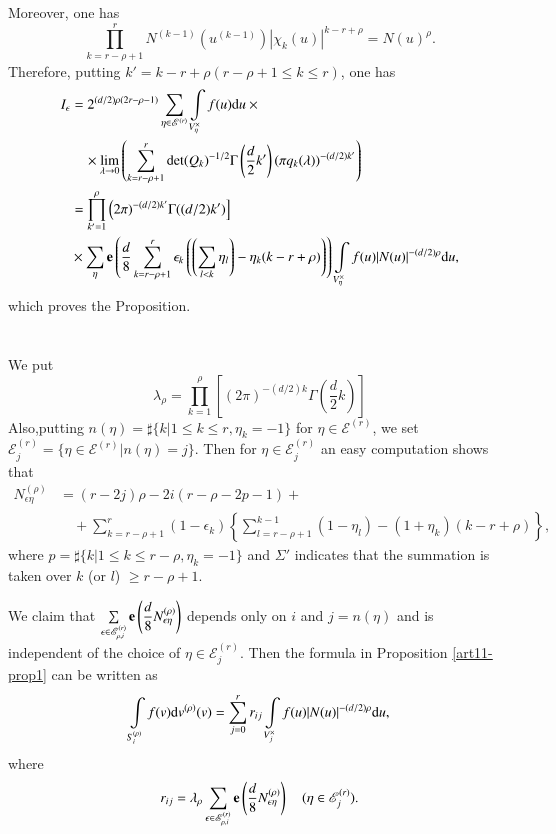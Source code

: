 Moreover, one has
$$
\prod\limits^{r}_{k=r-\rho+1}N^{(k-1)}(u^{(k-1)})|\chi_{k}(u)|^{k-r+\rho}=N(u)^{\rho}.
$$
Therefore, putting $k'=k-r+\rho(r-\rho+1\leq k\leq r)$, one has 
\begin{align*}
I_{\epsilon} &= 2^{(d/2)\rho(2r-\rho-1)}\sum\limits_{\eta\in \mathscr{E}^{(r)}}\int\limits_{V^{\times}_{\eta}}f(u)\mathrm{d} u\times {}\\
&\quad {}\times \lim\limits_{\lambda\to 0}\left(\sum\limits^{r}_{k=r-\rho+1}\det (Q_{k})^{-1/2}\Gamma\left(\dfrac{d}{2}k'\right)(\pi q_{k}(\lambda))^{-(d/2)k'}\right)\\
&=\prod\limits^{\rho}_{k'=1}\Big(2\pi)^{-(d/2)k'}\Gamma((d/2)k')\Big]\\
&{}\times \sum\limits_{\eta}\mathbf{e} \left(\dfrac{d}{8}\sum\limits^{r}_{k=r-\rho+1}\epsilon_{k}\left(\left(\sum\limits_{l<k}\eta_{l}\right)-\eta_{k}(k-r+\rho)\right)\right)\int\limits_{V^{\times}_{\eta}}f(u)|N(u)|^{-(d/2)\rho}\mathrm{d} u,
\end{align*}
which proves the Proposition.

\section{}\label{art11-sec5}
We put
$$
\lambda_{\rho}=\prod\limits^{\rho}_{k=1}\left[(2\pi)^{-(d/2)k}\Gamma\left(\frac{d}{2}k\right)\right]
$$
Also,\pageoriginale putting $n(\eta)=\sharp \{k|1\leq k\leq r, \eta_{k}=-1\}$ for $\eta\in\mathscr{E}^{(r)}$, we set $\mathscr{E}^{(r)}_{j}=\{\eta\in \mathscr{E}^{(r)}|n(\eta)=j\}$. Then for $\eta\in \mathscr{E}^{(r)}_{j}$ an easy computation shows that
\begin{align*}
N^{(\rho)}_{\epsilon \eta} &= (r-2j)\rho-2i(r-\rho-2p-1)+{}\\
&\quad {} + \sum\limits^{r}_{k=r-\rho+1}(1-\epsilon_{k})\left\{\sum\limits^{k-1}_{l=r-\rho+1}(1-\eta_{l})-(1+\eta_{k})(k-r+\rho)\right\},
\end{align*}
where $p=\sharp \{k | 1\leq k\leq r-\rho, \eta_{k}=-1\}$ and $\Sigma'$ indicates that the summation is taken over $k$ (or $l$) $\geq r-\rho+1$.

We claim that $\sum\limits_{\epsilon\in \mathscr{E}^{(r)}_{\rho,i}}\mathbf{e} \left(\dfrac{d}{8}N^{(\rho)}_{\epsilon\eta}\right)$ depends only on $i$ and $j=n(\eta)$ and is independent of the choice of $\eta\in \mathscr{E}^{(r)}_{j}$. Then the formula in Proposition \ref{art11-prop1} can be written as
\setcounter{equation}{18}
\begin{equation}
\int\limits_{S_{i}^{(\rho)}}f(v)\mathrm{d} v^{(\rho)}(v)=\sum\limits^{r}_{j=0}r_{ij}\int\limits_{V^{\times}_{j}}f(u) | N(u)|^{-(d/2)\rho}\mathrm{d} u,\label{art11-eq19}
\end{equation}
where
\begin{equation}
r_{ij}=\lambda_{\rho}\sum\limits_{\epsilon\in \mathscr{E}^{(r)}_{\rho,i}}\mathbf{e} \left(\dfrac{d}{8}N^{(\rho)}_{\epsilon\eta}\right)\quad (\eta\in \mathscr{E}^{(r)}_{j}).\label{art11-eq20}
\end{equation}

